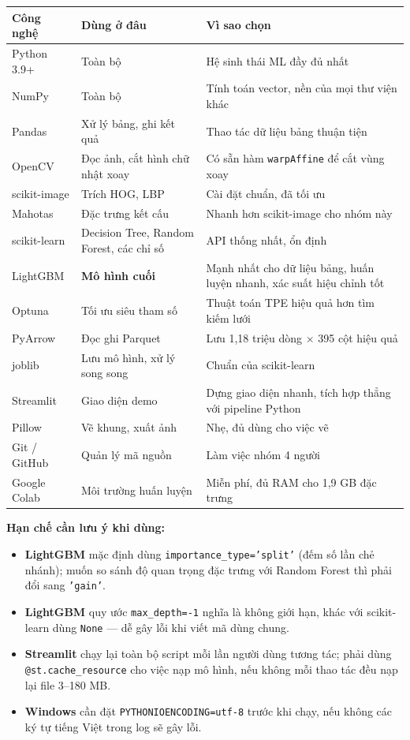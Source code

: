 \documentclass[12pt]{ai_conquer2026}
\begin{document}
\begin{center}
\begin{tabular}{|l|l|p{6.8cm}|}
\hline
\textbf{Công nghệ} & \textbf{Dùng ở đâu} & \textbf{Vì sao chọn} \\
\hline
Python 3.9+ & Toàn bộ & Hệ sinh thái ML đầy đủ nhất \\
\hline
NumPy & Toàn bộ & Tính toán vector, nền của mọi thư viện khác \\
\hline
Pandas & Xử lý bảng, ghi kết quả & Thao tác dữ liệu bảng thuận tiện \\
\hline
OpenCV & Đọc ảnh, cắt hình chữ nhật xoay & Có sẵn hàm \texttt{warpAffine} để cắt vùng xoay \\
\hline
scikit-image & Trích HOG, LBP & Cài đặt chuẩn, đã tối ưu \\
\hline
Mahotas & Đặc trưng kết cấu & Nhanh hơn scikit-image cho nhóm này \\
\hline
scikit-learn & Decision Tree, Random Forest, các chỉ số & API thống nhất, ổn định \\
\hline
LightGBM & \textbf{Mô hình cuối} & Mạnh nhất cho dữ liệu bảng, huấn luyện nhanh, xác suất hiệu chỉnh tốt \\
\hline
Optuna & Tối ưu siêu tham số & Thuật toán TPE hiệu quả hơn tìm kiếm lưới \\
\hline
PyArrow & Đọc ghi Parquet & Lưu 1,18 triệu dòng $\times$ 395 cột hiệu quả \\
\hline
joblib & Lưu mô hình, xử lý song song & Chuẩn của scikit-learn \\
\hline
Streamlit & Giao diện demo & Dựng giao diện nhanh, tích hợp thẳng với pipeline Python \\
\hline
Pillow & Vẽ khung, xuất ảnh & Nhẹ, đủ dùng cho việc vẽ \\
\hline
Git / GitHub & Quản lý mã nguồn & Làm việc nhóm 4 người \\
\hline
Google Colab & Môi trường huấn luyện & Miễn phí, đủ RAM cho 1,9 GB đặc trưng \\
\hline
\end{tabular}
\end{center}

\textbf{Hạn chế cần lưu ý khi dùng:}

\begin{itemize}
\item \textbf{LightGBM} mặc định dùng \texttt{importance\_type='split'} (đếm số lần chẻ nhánh); muốn so sánh độ quan trọng đặc trưng với Random Forest thì phải đổi sang \texttt{'gain'}.
\item \textbf{LightGBM} quy ước \texttt{max\_depth=-1} nghĩa là không giới hạn, khác với scikit-learn dùng \texttt{None} --- dễ gây lỗi khi viết mã dùng chung.
\item \textbf{Streamlit} chạy lại toàn bộ script mỗi lần người dùng tương tác; phải dùng \texttt{@st.cache\_resource} cho việc nạp mô hình, nếu không mỗi thao tác đều nạp lại file 3--180 MB.
\item \textbf{Windows} cần đặt \texttt{PYTHONIOENCODING=utf-8} trước khi chạy, nếu không các ký tự tiếng Việt trong log sẽ gây lỗi.
\end{itemize}
\end{document}
